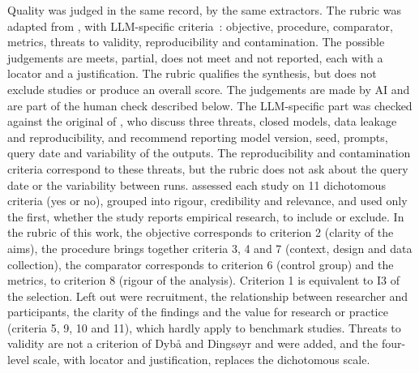 Quality was judged in the same record, by the same extractors. The rubric was adapted from
\citet{dyba2008agile}, with LLM-specific criteria~\citep{sallou2024breaking}: objective,
procedure, comparator, metrics, threats to validity, reproducibility and contamination. The possible judgements
are meets, partial, does not meet and not reported, each with a locator and a justification. The rubric qualifies the
synthesis, but does not exclude studies or produce an overall score. The judgements are made by AI and are part of the human check
described below.
The LLM-specific part was checked against the original of \citet{sallou2024breaking}, who discuss three
threats, closed models, data leakage and reproducibility, and recommend reporting model version, seed,
prompts, query date and variability of the outputs. The reproducibility and contamination criteria
correspond to these threats, but the rubric does not ask about the query date or the variability between
runs.
\citet{dyba2008agile} assessed each study on 11 dichotomous criteria (yes or no), grouped into
rigour, credibility and relevance, and used only the first, whether the study reports empirical research, to include or
exclude. In the rubric of this work, the objective corresponds to criterion 2 (clarity of the aims), the procedure
brings together criteria 3, 4 and 7 (context, design and data collection), the comparator corresponds to criterion 6 (control
group) and the metrics, to criterion 8 (rigour of the analysis). Criterion 1 is equivalent to I3 of the selection. Left out were
recruitment, the relationship between researcher and participants, the clarity of the findings and the value for research or
practice (criteria 5, 9, 10 and 11), which hardly apply to benchmark studies. Threats to validity are not
a criterion of Dybå and Dingsøyr and were added, and the four-level scale, with locator and justification,
replaces the dichotomous scale.

